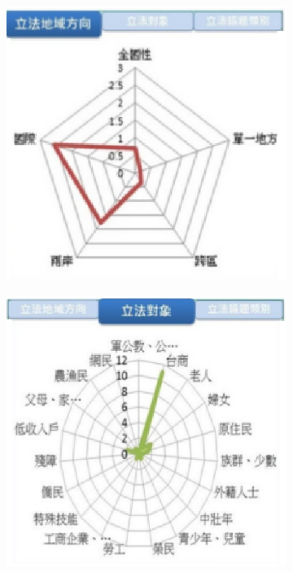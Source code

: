 \begin{figure}[h]
  \centering
  \begin{subfigure}{.3\textwidth}
    \centering
    \includegraphics[scale=0.35]{figuras/aspecto1.eps}
  \end{subfigure}%
  \begin{subfigure}{.3\textwidth}
    \centering
    \includegraphics[scale=0.3]{figuras/aspecto2.eps}

\end{subfigure}
\end{figure}
